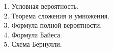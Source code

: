 
1. Условная вероятность. \\


2. Теорема сложения и умножения. \\


3. Формула полной вероятности. \\


4. Формула Байеса. \\


5. Схема Бернулли. \\
